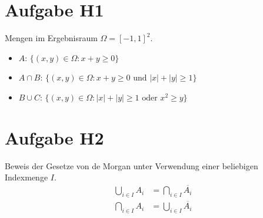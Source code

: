\documentclass{article}
\begin{document}
\section*{Aufgabe H1}
Mengen im Ergebnisraum $\Omega = [-1, 1]^2$.
\begin{itemize}
    \item $A$: $\{(x, y) \in \Omega : x + y \geq 0\}$
    \item $A \cap B$: $\{(x, y) \in \Omega : x + y \geq 0 \text{ und } |x| + |y| \geq 1\}$
    \item $B \cup C$: $\{(x, y) \in \Omega : |x| + |y| \geq 1 \text{ oder } x^2 \geq y\}$
\end{itemize}

\section*{Aufgabe H2}
Beweis der Gesetze von de Morgan unter Verwendung einer beliebigen Indexmenge $I$.
\begin{align*}
    \bigcup_{i \in I} A_i &= \bigcap_{i \in I} \overline{A_i} \\
    \bigcap_{i \in I} A_i &= \bigcup_{i \in I} \overline{A_i}
\end{align*}
\end{document}
